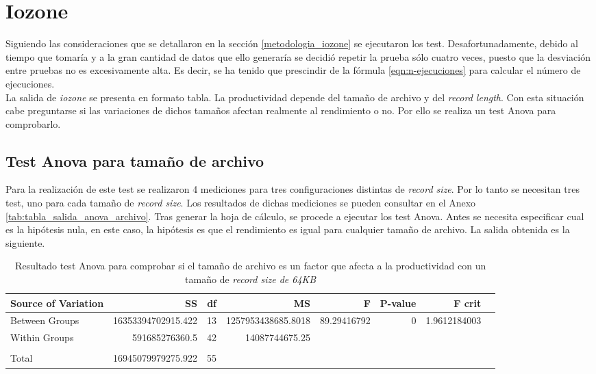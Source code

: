 \section{Iozone}
Siguiendo las consideraciones que se detallaron en la sección \ref{metodologia_iozone} se ejecutaron los test. Desafortunadamente, debido al tiempo que tomaría y a la gran cantidad de datos que ello generaría se decidió repetir la prueba sólo cuatro veces, puesto que la desviación entre pruebas no es excesivamente alta. Es decir, se ha tenido que prescindir de la fórmula \ref{eqn:n-ejecuciones} para calcular el número de ejecuciones.\\

La salida de \textit{iozone} se presenta en formato tabla. La productividad depende del tamaño de archivo y del \textit{record length}. Con esta situación cabe preguntarse si las variaciones de dichos tamaños afectan realmente al rendimiento o no. Por ello se realiza un test Anova para comprobarlo.

\subsection{Test Anova para tamaño de archivo}
Para la realización de este test se realizaron 4 mediciones para tres configuraciones distintas de \textit{record size}. Por lo tanto se necesitan tres test, uno para cada tamaño de \textit{record size}.  Los resultados de dichas mediciones se pueden consultar en el Anexo \ref{tab:tabla_salida_anova_archivo}. Tras generar la hoja de cálculo, se procede a ejecutar los test Anova. Antes se necesita especificar cual es la hipótesis nula, en este caso, la hipótesis es que el rendimiento es igual para cualquier tamaño de archivo. La salida obtenida es la siguiente. 

\begin{table}[H]\centering
\scriptsize
\begin{tabular}{lrrrrrrr}\toprule
Source of Variation &SS &df &MS &F &P-value &F crit \\\midrule
Between Groups &16353394702915.422 &13 &1257953438685.8018 &89.29416792 &0 &1.9612184003 \\
Within Groups &591685276360.5 &42 &14087744675.25 & & & \\
& & & & & & \\
Total &16945079979275.922 &55 & & & & \\
\bottomrule
\end{tabular}
\caption{Resultado test Anova para comprobar si el tamaño de archivo es un factor que afecta a la productividad con un tamaño de \textit{record size de 64KB}}\label{tab: }
\end{table}


